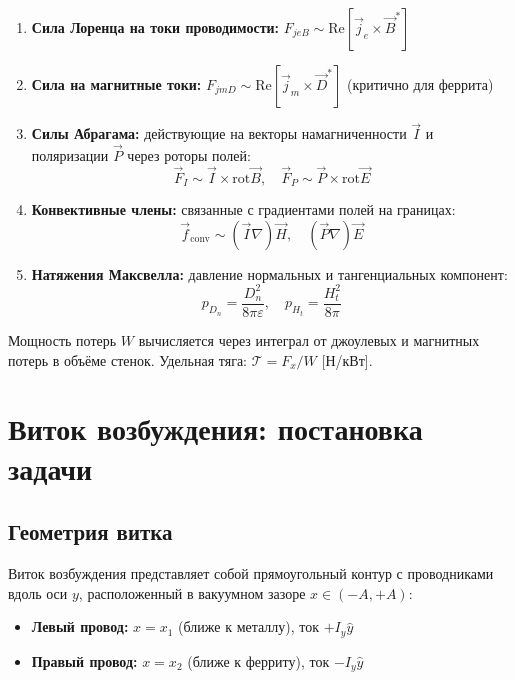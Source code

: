 \documentclass[a4paper,12pt]{article}
\begin{document}
\begin{enumerate}
    \item \textbf{Сила Лоренца на токи проводимости:}
    $F_{jeB} \sim \text{Re}[\vec{j}_e \times \vec{B}^*]$

    \item \textbf{Сила на магнитные токи:} 
    $F_{jmD} \sim \text{Re}[\vec{j}_m \times \vec{D}^*]$ (критично для феррита)

    \item \textbf{Силы Абрагама:} действующие на векторы намагниченности
    $\vec{I}$ и поляризации $\vec{P}$ через роторы полей:
    \begin{equation}
    \vec{F}_I \sim \vec{I} \times \text{rot}\vec{B}, \quad
    \vec{F}_P \sim \vec{P} \times \text{rot}\vec{E}
    \end{equation}

    \item \textbf{Конвективные члены:} связанные с градиентами полей на границах:
    \begin{equation}
    \vec{f}_{\text{conv}} \sim (\vec{I}\nabla)\vec{H}, \quad (\vec{P}\nabla)\vec{E}
    \end{equation}

    \item \textbf{Натяжения Максвелла:} давление нормальных и тангенциальных
    компонент:
    \begin{equation}
    p_{D_n} = \frac{D_n^2}{8\pi\varepsilon}, \quad
    p_{H_t} = \frac{H_t^2}{8\pi}
    \end{equation}
\end{enumerate}

Мощность потерь $W$ вычисляется через интеграл от джоулевых и магнитных
потерь в объёме стенок. Удельная тяга: $\mathcal{T} = F_x / W$ [Н/кВт].

\section{Виток возбуждения: постановка задачи}

\subsection{Геометрия витка}

Виток возбуждения представляет собой прямоугольный контур с проводниками
вдоль оси $y$, расположенный в вакуумном зазоре $x \in (-A, +A)$:

\begin{itemize}
    \item \textbf{Левый провод:} $x = x_1$ (ближе к металлу), ток $+I_y \hat{y}$
    \item \textbf{Правый провод:} $x = x_2$ (ближе к ферриту), ток $-I_y \hat{y}$
\end{itemize}
\end{document}
